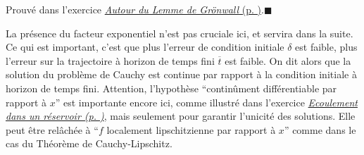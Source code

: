 \hypertarget{duxe9monstration-5}{}
\begin{preuve}\label{duxe9monstration-5}
Prouvé dans l'exercice \protect\hyperlink{exo_gronwall}{\emph{Autour du
Lemme de Grönwall} (p. \pageref*{exo_gronwall})}.\hfill$\blacksquare$
\end{preuve}

La présence du facteur exponentiel n'est pas cruciale ici, et servira
dans la suite. Ce qui est important, c'est que plus l'erreur de
condition initiale \(\delta\) est faible, plus l'erreur sur la
trajectoire à horizon de temps fini \(\overline{t}\) est faible. On dit
alors que la solution du problème de Cauchy est continue par rapport à
la condition initiale à horizon de temps fini. Attention, l'hypothèse
``continûment différentiable par rapport à \(x\)'' est importante encore
ici, comme illustré dans l'exercice
\emph{\protect\hyperlink{exo_Torricelli}{Ecoulement dans un réservoir
		(p. \pageref*{exo_Torricelli})}}, mais seulement pour garantir l'unicité
des solutions. Elle peut être relâchée à ``\(f\) localement
lipschitzienne par rapport à \(x\)'' comme dans le cas du Théorème de
Cauchy-Lipschitz.

